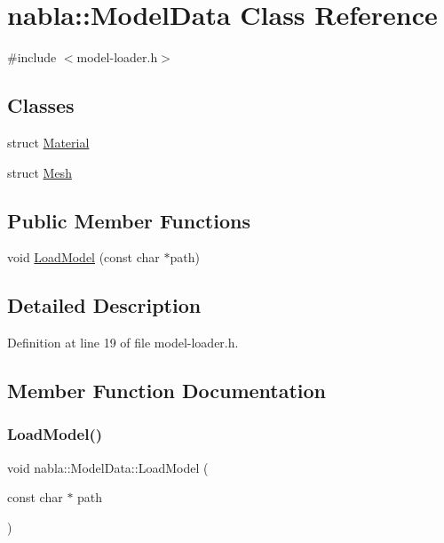\hypertarget{classnabla_1_1_model_data}{}\section{nabla\+::Model\+Data Class Reference}
\label{classnabla_1_1_model_data}


{\ttfamily \#include $<$model-\/loader.\+h$>$}

\subsection*{Classes}
\begin{DoxyCompactItemize}
\item 
struct \mbox{\hyperlink{structnabla_1_1_model_data_1_1_material}{Material}}
\item 
struct \mbox{\hyperlink{structnabla_1_1_model_data_1_1_mesh}{Mesh}}
\end{DoxyCompactItemize}
\subsection*{Public Member Functions}
\begin{DoxyCompactItemize}
\item 
void \mbox{\hyperlink{classnabla_1_1_model_data_a88b0642b5de5aaeb078614985a702121}{Load\+Model}} (const char $\ast$path)
\end{DoxyCompactItemize}


\subsection{Detailed Description}


Definition at line 19 of file model-\/loader.\+h.



\subsection{Member Function Documentation}
\mbox{\label{classnabla_1_1_model_data_a88b0642b5de5aaeb078614985a702121}} 
\subsubsection{\texorpdfstring{LoadModel()}{LoadModel()}}
{\footnotesize\ttfamily void nabla\+::\+Model\+Data\+::\+Load\+Model (\begin{DoxyParamCaption}\item[{const char $\ast$}]{path }\end{DoxyParamCaption})\hspace{0.3cm}{\ttfamily [inline]}}

